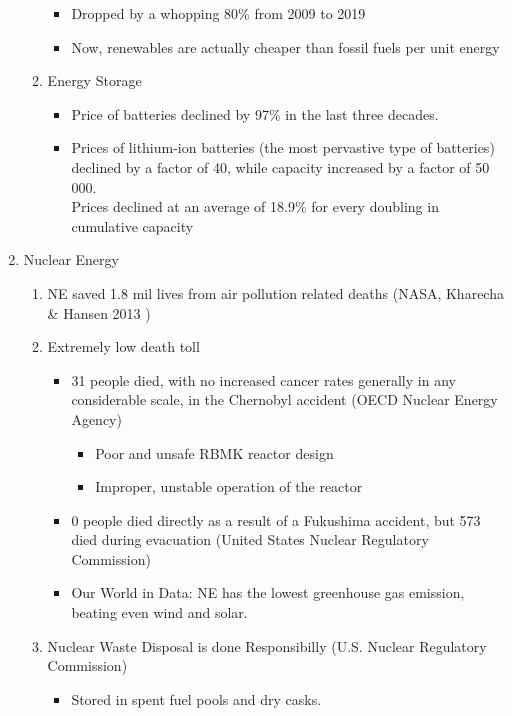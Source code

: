 \documentclass[oneside]{book}
\begin{document}
\begin{enumerate}
\begin{enumerate}
\begin{itemize}
            \item Dropped by a whopping 80\% from 2009 to 2019
            \item Now, renewables are actually cheaper than fossil fuels per unit energy
        \end{itemize} 
        \item Energy Storage
        \begin{itemize}
            \item Price of batteries declined by 97\% in the last three decades.
            \item Prices of lithium-ion batteries \footnotesize (the most pervastive type of batteries) \normalsize declined by a factor of 40, while capacity increased by a factor of 50 000.\\[2mm]
            Prices declined at an average of 18.9\% for every doubling in cumulative capacity
        \end{itemize}
    \end{enumerate}
    \item Nuclear Energy 
    \begin{enumerate}
        \item NE saved 1.8 mil lives from air pollution related deaths (NASA, Kharecha \& Hansen 2013
        )
        \item Extremely low death toll \begin{itemize}
            \item 31 people died, with no increased cancer rates generally in any considerable scale, in the Chernobyl accident (OECD Nuclear Energy Agency) \begin{itemize}
                \item Poor and unsafe RBMK reactor design
                \item Improper, unstable operation of the reactor 
            \end{itemize}
            \item 0 people died directly as a result of a Fukushima accident, but 573 died during evacuation (United States Nuclear Regulatory Commission)
            \item Our World in Data: NE has the lowest greenhouse gas emission, beating even wind and solar.
        \end{itemize}
        \item Nuclear Waste Disposal is done Responsibilly (U.S. Nuclear Regulatory Commission) \begin{itemize}
            \item Stored in spent fuel pools and dry casks.

\end{itemize}
\end{enumerate}
\end{enumerate}
\end{document}
